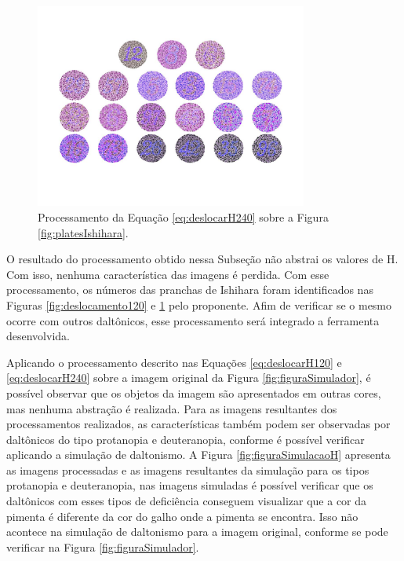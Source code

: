 \documentclass[	12pt, Times, openright, twoside, a4paper, english, brazil]{abntex2}
\begin{document}
\begin{figure}[!htb]
\centering \includegraphics[width=0.80\textwidth]{figuraDeslocar240.jpg}
\caption{Processamento da Equação \ref{eq:deslocarH240} sobre a Figura \ref{fig:platesIshihara}. \label{fig:deslocamento240}}
\end{figure}

O resultado do processamento obtido nessa Subseção não abstrai os valores de H. Com isso, nenhuma característica das imagens é perdida. Com esse processamento, os números das pranchas de Ishihara foram identificados nas Figuras \ref{fig:deslocamento120} e \ref{fig:deslocamento240} pelo proponente. Afim de verificar se o mesmo ocorre com outros daltônicos, esse processamento será integrado a ferramenta desenvolvida.

Aplicando o processamento descrito nas Equações \ref{eq:deslocarH120} e \ref{eq:deslocarH240} sobre a imagem original da Figura \ref{fig:figuraSimulador}, é possível observar que os objetos da imagem são apresentados em outras cores, mas nenhuma abstração é realizada. Para as imagens resultantes dos processamentos realizados, as características também podem ser observadas por daltônicos do tipo protanopia e deuteranopia, conforme é possível verificar aplicando a simulação de daltonismo. A Figura \ref{fig:figuraSimulacaoH} apresenta as imagens processadas e as imagens resultantes da simulação para os tipos protanopia e deuteranopia, nas imagens simuladas é possível verificar que os daltônicos com esses tipos de deficiência conseguem visualizar que a cor da pimenta é diferente da cor do galho onde a pimenta se encontra. Isso não acontece na simulação de daltonismo para a imagem original, conforme se pode verificar na Figura \ref{fig:figuraSimulador}.
\end{document}
